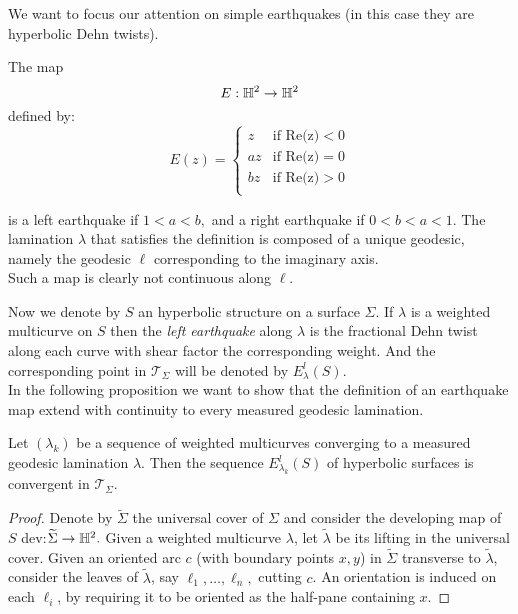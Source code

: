 We want to focus our attention on simple earthquakes (in this case they are hyperbolic Dehn twists). 

\begin{example}\label{simplequake}
    The map 
    \[
        E:\mathbb{H}^2\to\mathbb{H}^2
    \]
    defined by:
    \[
      E(z)= \begin{cases}
        z & \text{if Re(z)}<0 \\
        az & \text{if Re(z)}=0 \\
        bz & \text{if Re(z)}>0 \\    
    \end{cases}
    \]
    
    is a left earthquake if $1<a<b,$ and a right earthquake if $0<b<a<1$. The lamination $\lambda$ that satisfies the definition is composed of a unique geodesic, namely the geodesic $\ell$ corresponding to the imaginary axis. \\
    Such a map is clearly not continuous along $\ell$.    
\end{example}

Now we denote by $S$ an hyperbolic structure on a surface $\Sigma$. If $\lambda$ is a weighted multicurve on $S$ then the \textit{left earthquake} along $\lambda$ is the fractional Dehn twist along each curve with shear factor the corresponding weight. And the corresponding point in $\mathcal{T_\Sigma}$ will be denoted by $E_\lambda^l(S)$. \\
In the following proposition we want to show that the definition of an earthquake map extend with continuity to every measured geodesic lamination. 

\begin{proposition}
    Let $(\lambda_k)$ be a sequence of weighted multicurves converging to a measured geodesic lamination $\lambda$. Then the sequence $E_{\lambda_k}^l(S)$ of hyperbolic surfaces is convergent in $\mathcal{T}_\Sigma.$
\end{proposition}

\begin{proof}
Denote by $\widetilde{\Sigma}$ the universal cover of $\Sigma$ and consider the developing map of $S$ dev:$\widetilde{\Sigma}\to\mathbb{H}^2.$ Given a weighted multicurve $\lambda$, let $\widetilde{\lambda}$ be its lifting in the universal cover. Given an oriented arc $c$ (with boundary points $x,y$) in $\widetilde{\Sigma}$ transverse to $\widetilde{\lambda}$, consider the leaves of $\widetilde{\lambda}$, say $\ell_1,\dots,\ell_n,$ cutting $c$. An orientation is induced on each $\ell_i$, by requiring it to be oriented as the half-pane containing $x$.      
\end{proof}
    

